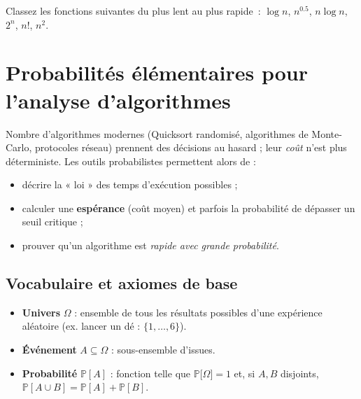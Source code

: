 \begin{exercice}
Classez les fonctions suivantes du plus lent au plus rapide :
$\log n$, $n^{0.5}$, $n\log n$, $2^{n}$, $n!$, $n^{2}$.
\end{exercice}



\section{Probabilités élémentaires pour l’analyse d’algorithmes}

Nombre d’algorithmes modernes (Quicksort randomisé, algorithmes de Monte-Carlo,
protocoles réseau) prennent des décisions au hasard ; leur \emph{coût} n’est
plus déterministe.  Les outils probabilistes permettent alors de :
\begin{itemize}
  \item décrire la « loi » des temps d’exécution possibles ;
  \item calculer une \textbf{espérance} (coût moyen) et parfois la probabilité
        de dépasser un seuil critique ;
  \item prouver qu’un algorithme est \emph{rapide avec grande probabilité}.
\end{itemize}

\subsection{Vocabulaire et axiomes de base}
\begin{itemize}
  \item \textbf{Univers} $\Omega$ : ensemble de tous les résultats possibles
        d’une expérience aléatoire (ex. lancer un dé : $\{1,\dots,6\}$).
  \item \textbf{Événement} $A\subseteq\Omega$ : sous-ensemble d’issues.
  \item \textbf{Probabilité} \(\mathbb{P}[A]\) : fonction telle que
        \(\mathbb{P}\bigl[\Omega\bigr]=1\) et, si $A,B$ disjoints,
        \(\mathbb{P}[A\cup B]=\mathbb{P}[A]+\mathbb{P}[B]\).
\end{itemize}

